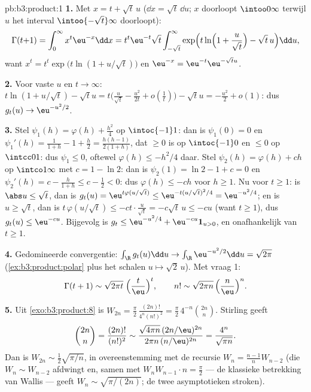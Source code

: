 \begin{solution}{pb:b3:product:1}
\textbf{1.} Met $x = t + \sqrt t\,u$ ($\dd x = \sqrt t\,\dd u$;
$x$ doorloopt $\intoo0\infty$ terwijl $u$ het interval
$\intoo{-\sqrt t}\infty$ doorloopt):
\[
\Gamma(t{+}1) = \int_0^\infty x^t\eu^{-x}\dd x
= t^t\eu^{-t}\sqrt t\int_{-\sqrt t}^{\infty}
\exp\Bigl(t\ln\Bigl(1 + \frac u{\sqrt t}\Bigr) - \sqrt
t\,u\Bigr)\dd u,
\]
want $x^t = t^t\exp\bigl(t\ln(1 + u/\sqrt t)\bigr)$ en $\eu^{-x} =
\eu^{-t}\eu^{-\sqrt tu}$.

\textbf{2.} Voor vaste $u$ en $t \to \infty$: $t\ln(1 + u/\sqrt t)
- \sqrt tu = t\bigl(\frac u{\sqrt t} - \frac{u^2}{2t} +
o(\frac1t)\bigr) - \sqrt tu = -\frac{u^2}2 + o(1)$: dus $g_t(u)
\to \eu^{-u^2/2}$.

\textbf{3.} Stel $\psi_1(h) = \varphi(h) + \frac{h^2}4$ op
$\intoc{-1}1$: dan is $\psi_1(0) = 0$ en $\psi_1'(h) =
\frac1{1+h} - 1 + \frac h2 = \frac{h(h-1)}{2(1+h)}$, dat $\geq 0$
is op $\intoc{-1}0$ en $\leq 0$ op $\intcc01$: dus $\psi_1 \leq
0$, oftewel $\varphi(h) \leq -h^2/4$ daar. Stel $\psi_2(h) =
\varphi(h) + ch$ op $\intco1\infty$ met $c = 1 - \ln2$: dan is
$\psi_2(1) = \ln2 - 1 + c = 0$ en $\psi_2'(h) = c - \frac h{1+h}
\leq c - \frac12 < 0$: dus $\varphi(h) \leq -ch$ voor $h \geq 1$.
Nu voor $t \geq 1$: is $\abs u \leq \sqrt t$, dan is $g_t(u) =
\eu^{t\varphi(u/\sqrt t)} \leq \eu^{-t(u/\sqrt t)^2/4} =
\eu^{-u^2/4}$; en is $u \geq \sqrt t$, dan is $t\,\varphi(u/\sqrt
t) \leq -ct\cdot\frac u{\sqrt t} = -c\sqrt t\,u \leq -cu$ (want $t
\geq 1$), dus $g_t(u) \leq \eu^{-cu}$. Bijgevolg is $g_t \leq
\eu^{-u^2/4} + \eu^{-cu}\mathbf 1_{u>0}$,  en
onafhankelijk van $t \geq 1$.

\textbf{4.} Gedomineerde convergentie: $\int_\R g_t(u)\dd u \to
\int_\R\eu^{-u^2/2}\dd u = \sqrt{2\pi}$
(\cref{ex:b3:product:polar} plus het schalen $u\mapsto\sqrt2\,u$).
Met vraag 1:
\[
\Gamma(t + 1) \sim \sqrt{2\pi t}\;\Bigl(\frac
t\eu\Bigr)^t,\qquad
n! \sim \sqrt{2\pi n}\,\Bigl(\frac n\eu\Bigr)^n .
\]

\textbf{5.} Uit \cref{exo:b3:product:8} is $W_{2n} =
\frac\pi2\,\frac{(2n)!}{4^n(n!)^2} = \frac\pi2\,4^{-n}\binom{2n}n$.
Stirling geeft
\[
\binom{2n}{n} = \frac{(2n)!}{(n!)^2}
\sim \frac{\sqrt{4\pi n}\,(2n/\eu)^{2n}}
{2\pi n\,(n/\eu)^{2n}} = \frac{4^n}{\sqrt{\pi n}} .
\]
Dan is $W_{2n} \sim \frac12\sqrt{\pi/n}$, in overeenstemming met
de recursie $W_n = \frac{n-1}nW_{n-2}$ (die $W_n \sim W_{n-2}$
afdwingt en, samen met $W_nW_{n-1}\cdot n = \frac\pi2$ --- de
klassieke betrekking van Wallis --- geeft $W_n \sim
\sqrt{\pi/(2n)}$; de twee asymptotieken stroken).


\end{solution}
